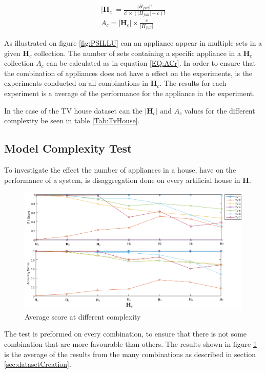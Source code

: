 \begin{gather}
		|\textbf{H}_c| = \frac{|H_{full}|!}{c! \times (|H_{full}| - c)!} \label{EQ:nCr} \\
		A_c = |\textbf{H}_c| \times \frac{c}{|H_{full}|} \label{EQ:ACr}
\end{gather}


As illustrated on figure \ref{fig:PSILLU} can an appliance appear in multiple sets in a given $\textbf{H}_c$ collection. The number of sets containing a specific appliance in a $\textbf{H}_c$ collection $A_c$ can be calculated as in equation \ref{EQ:ACr}. In order to ensure that the combination of appliances does not have a effect on the experiments, is the experiments conducted on all combinations in $\textbf{H}_c$. The results for each experiment is a average of the performance for the appliance in the experiment. 



In the case of the TV house dataset can the $|\textbf{H}_c|$ and $A_c$ values for the different complexity be seen in table \ref{Tab:TvHouse}.


\subsection{Model Complexity Test}
To investigate the effect the number of appliances in a house, have on the performance of a  system, is disaggregation done on every artificial house in $\textbf{H}$.

\begin{figure}[H]
\centering
\includegraphics[width=1\textwidth]{billeder/ModelSize.png}
\caption{Average score at different complexity }
\label{fig:COMPT}
\end{figure}

The test is preformed on every combination, to ensure that there is not some combination that are more favourable than others. The results shown in figure \ref{fig:COMPT} is the average of the results from the many combinations as described in section \ref{sec:datasetCreation}. 

